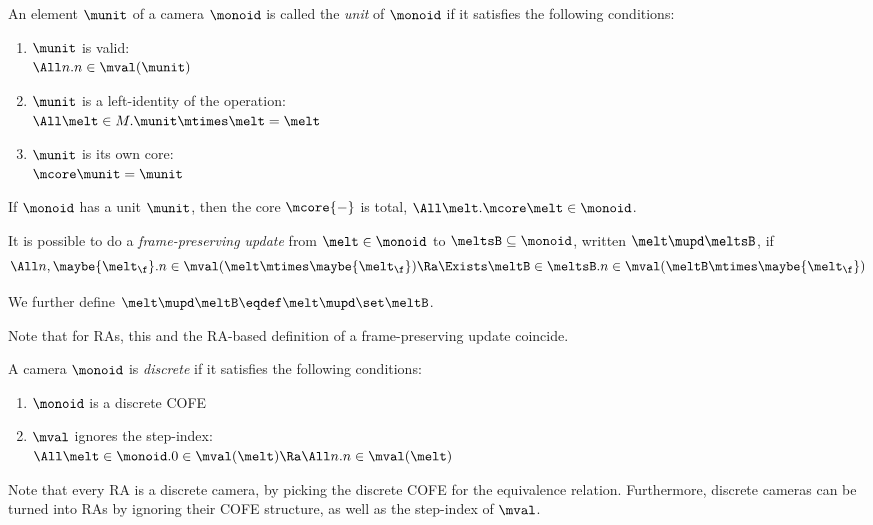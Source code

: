 \begin{defn}
  An element $\munit$ of a camera $\monoid$ is called the \emph{unit} of $\monoid$ if it satisfies the following conditions:
  \begin{enumerate}[itemsep=0pt]
  \item $\munit$ is valid: \\ $\All n. n \in \mval(\munit)$
  \item $\munit$ is a left-identity of the operation: \\
    $\All \melt \in M. \munit \mtimes \melt = \melt$
  \item $\munit$ is its own core: \\ $\mcore\munit = \munit$
  \end{enumerate}
\end{defn}

\begin{lem}\label{lem:camera-unit-total-core}
  If $\monoid$ has a unit $\munit$, then the core $\mcore{{-}}$ is total, \ie $\All\melt. \mcore\melt \in \monoid$.
\end{lem}

\begin{defn}
  It is possible to do a \emph{frame-preserving update} from $\melt \in \monoid$ to $\meltsB \subseteq \monoid$, written $\melt \mupd \meltsB$, if
  \[ \All n, \maybe{\melt_\f}. n \in \mval(\melt \mtimes \maybe{\melt_\f}) \Ra \Exists \meltB \in \meltsB. n \in\mval(\meltB \mtimes \maybe{\melt_\f}) \]

  We further define $\melt \mupd \meltB \eqdef \melt \mupd \set\meltB$.
\end{defn}
Note that for RAs, this and the RA-based definition of a frame-preserving update coincide.

\begin{defn}
  A camera $\monoid$ is \emph{discrete} if it satisfies the following conditions:
  \begin{enumerate}[itemsep=0pt]
  \item $\monoid$ is a discrete COFE
  \item $\mval$ ignores the step-index: \\
    $\All \melt \in \monoid. 0 \in \mval(\melt) \Ra \All n. n \in \mval(\melt)$
  \end{enumerate}
\end{defn}
Note that every RA is a discrete camera, by picking the discrete COFE for the equivalence relation.
Furthermore, discrete cameras can be turned into RAs by ignoring their COFE structure, as well as the step-index of $\mval$.


